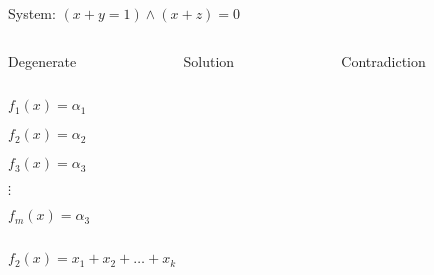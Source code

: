 \begin{frame}

    System: $(x + y = 1) \land (x + z) = 0$
	\begin{columns}
        \begin{column}{3cm}
            Degenerate
        \end{column}
        \begin{column}{3cm}
            Solution
    \end{column}
        \begin{column}{3cm}
            Contradiction
        \end{column}
    \end{columns}

    
    \begin{columns}
        \begin{column}{3cm}
            
        \end{column}
        \begin{column}{3cm}
            
        \end{column}
        \begin{column}{3cm}
            
        \end{column}
    \end{columns}

\end{frame}


\begin{frame}

    \begin{columns}
        \begin{column}{2.5cm}
            $f_1(x) = \alpha_1$

            $f_2(x) = \alpha_2$

            $f_3(x) = \alpha_3$

            $\vdots$

            $f_m(x) = \alpha_3$
        \end{column}
        \begin{column}{9.5cm}
            
	    \end{column}
    \end{columns}

    $f_2(x) = x_1 + x_2 + \dots + x_k$

\end{frame}
